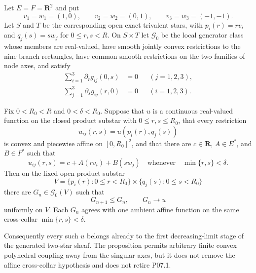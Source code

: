 
\begin{proposition}
\label{prop:p071-trivalent-affine-cross-collar-smoothing}
Let $E=F=\mathbf R^2$ and put
\[
 v_1=w_1=(1,0),\qquad
 v_2=w_2=(0,1),\qquad
 v_3=w_3=(-1,-1).
\]
Let $S$ and $T$ be the corresponding open exact trivalent stars, with
$p_i(r)=rv_i$ and $q_j(s)=sw_j$ for $0\leq r,s<R$.  On $S\times T$ let
$\mathcal G_0$ be the local generator class whose members are real-valued,
have smooth jointly convex restrictions to the nine branch rectangles,
have common smooth restrictions on the two families of node axes, and
satisfy
\begin{align}
 \sum_{i=1}^3\partial_rg_{ij}(0,s)&=0
       &&(j=1,2,3),
 \label{eq:p071-cross-collar-first-balance}\\
 \sum_{j=1}^3\partial_sg_{ij}(r,0)&=0
       &&(i=1,2,3).
 \label{eq:p071-cross-collar-second-balance}
\end{align}

Fix $0<R_0<R$ and $0<\delta<R_0$.  Suppose that $u$ is a continuous
real-valued function on the closed product substar with $0\leq r,s\leq
R_0$, that every restriction
\[
                         u_{ij}(r,s)=u(p_i(r),q_j(s))
\]
is convex and piecewise affine on $[0,R_0]^2$, and that there are
$c\in\mathbf R$, $A\in E^*$, and $B\in F^*$ such that
\begin{equation}
 u_{ij}(r,s)=c+A(rv_i)+B(sw_j)
 \quad\text{whenever}\quad \min\{r,s\}<\delta.
 \label{eq:p071-cross-collar-affine-data}
\end{equation}
Then on the fixed open product substar
\[
 V=\{p_i(r):0\leq r<R_0\}\times
   \{q_j(s):0\leq s<R_0\}
\]
there are $G_n\in\mathcal G_0(V)$ such that
\begin{equation}
                         G_{n+1}\leq G_n,
             \qquad G_n\longrightarrow u
 \label{eq:p071-cross-collar-monotone-approximation}
\end{equation}
uniformly on $V$.  Each $G_n$ agrees with one ambient affine function on
the same cross-collar $\min\{r,s\}<\delta$.

Consequently every such $u$ belongs already to the first decreasing-limit
stage of the generated two-star sheaf.  The proposition permits arbitrary
finite convex polyhedral coupling away from the singular axes, but it does
not remove the affine cross-collar hypothesis and does not retire P07.1.
\end{proposition}
